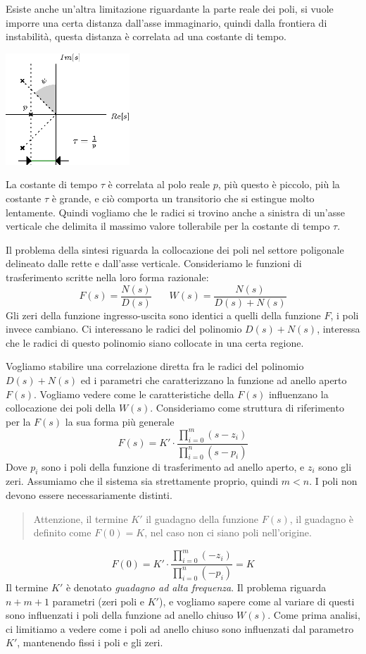 \documentclass[10pt, letterpaper]{report}
\begin{document}
Esiste anche un'altra limitazione riguardante la parte reale dei poli, si vuole imporre una certa distanza dall'asse immaginario, quindi dalla frontiera di instabilità, questa distanza è correlata ad una costante di tempo. 
\begin{center}
    \includegraphics[width=0.35\textwidth ]{images/radiceReale.eps}
\end{center}
La costante di tempo $\tau$ è correlata al polo reale $p$, più questo è piccolo, più la costante $\tau$ è grande, e ciò comporta un transitorio che si estingue molto lentamente. Quindi vogliamo che le radici si trovino anche a sinistra di un'asse verticale che delimita il massimo valore tollerabile per la costante di tempo $\tau$.\bigskip 

Il problema della sintesi riguarda la collocazione dei poli nel settore poligonale delineato dalle rette e dall'asse verticale. Consideriamo le funzioni di trasferimento scritte nella loro forma razionale: 
$$ F(s)=\frac{N(s)}{D(s)} \ \ \ \ \ \ \ \ W(s)=\frac{N(s)}{D(s)+N(s)}$$
Gli zeri della funzione ingresso-uscita sono identici a quelli della funzione $F$, i poli invece cambiano. Ci interessano le radici del polinomio $D(s)+N(s)$, interessa che le radici di questo polinomio siano collocate in una certa regione.\bigskip 

Vogliamo stabilire una correlazione diretta fra le radici del polinomio $D(s)+N(s)$ ed i parametri che caratterizzano la funzione ad anello aperto $F(s)$. Vogliamo vedere come le caratteristiche della $F(s)$ influenzano la collocazione dei poli della $W(s)$. Consideriamo come struttura di riferimento per la $F(s)$ la sua forma più generale 
$$ F(s)=K'\cdot \frac{\displaystyle\prod_{i=0}^m(s-z_i)}{\displaystyle\prod_{i=0}^n(s-p_i)}$$
Dove $p_i$ sono i poli della funzione di trasferimento ad anello aperto, e $z_i$ sono gli zeri. Assumiamo che il sistema sia strettamente proprio, quindi $m<n$. I poli non devono essere necessariamente distinti. \begin{quote}
    Attenzione, il termine $K'$ il guadagno della funzione $F(s)$, il guadagno è definito come $F(0)=K$, nel caso non ci siano poli nell'origine.
\end{quote}
$$ F(0)=K'\cdot\frac{\displaystyle\prod_{i=0}^m (-z_i)}{\displaystyle\prod_{i=0}^n (-p_i)}=K$$
Il termine $K'$ è denotato \textit{guadagno ad alta frequenza}. Il problema riguarda $n+m+1$ parametri (zeri poli e $K'$), e vogliamo sapere come al variare di questi sono influenzati i poli della funzione ad anello chiuso $W(s)$. Come prima analisi, ci limitiamo a vedere come i poli ad anello chiuso sono influenzati dal parametro $K'$, mantenendo fissi i poli e gli zeri.\bigskip 
\end{document}
